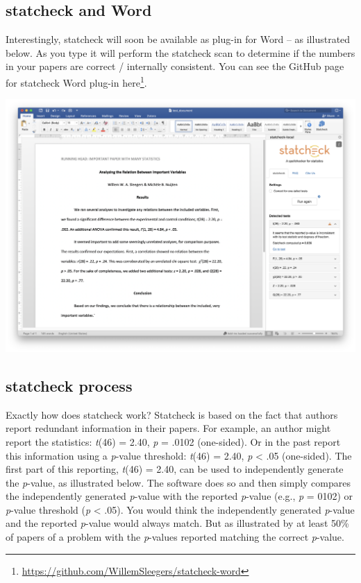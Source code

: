 \documentclass[
]{krantz}
\renewcommand{\href}[2]{#2\footnote{\url{#1}}}
\begin{document}
\hypertarget{statcheck-and-word}{%
\subsection{statcheck and Word}\label{statcheck-and-word}}

Interestingly, statcheck will soon be available as plug-in for Word -- as illustrated below. As you type it will perform the statcheck scan to determine if the numbers in your papers are correct / internally consistent. You can see the GitHub page for statcheck Word plug-in \href{https://github.com/WillemSleegers/statcheck-word}{here}.

\includegraphics[width=0.8\linewidth]{ch_tools/images/statcheck_word}

\hypertarget{statcheck-process}{%
\subsection{statcheck process}\label{statcheck-process}}

Exactly how does statcheck work? Statcheck is based on the fact that authors report redundant information in their papers. For example, an author might report the statistics: \emph{t}(46) = 2.40, \emph{p} = .0102 (one-sided). Or in the past report this information using a \emph{p}-value threshold: \emph{t}(46) = 2.40, \emph{p} \textless{} .05 (one-sided). The first part of this reporting, \emph{t}(46) = 2.40, can be used to independently generate the \emph{p}-value, as illustrated below. The software does so and then simply compares the independently generated \emph{p}-value with the reported \emph{p}-value (e.g., \emph{p} = 0102) or \emph{p}-value threshold (\emph{p} \textless{} .05). You would think the independently generated \emph{p}-value and the reported \emph{p}-value would always match. But as illustrated by \citep{nuijten2016prevalence} at least 50\% of papers of a problem with the \emph{p}-values reported matching the correct \emph{p}-value.
\end{document}
